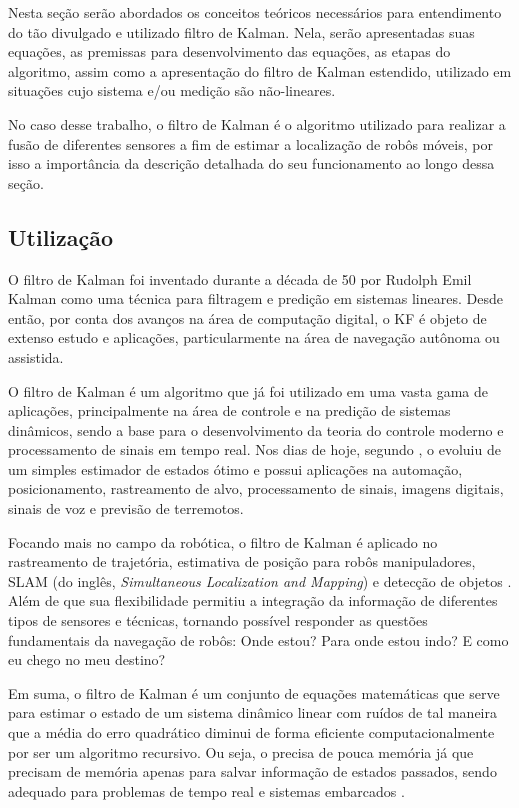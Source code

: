 \documentclass[acronym, symbols, table]{fei}
\begin{document}
		Nesta seção serão abordados os conceitos teóricos necessários para entendimento do tão divulgado e utilizado filtro de Kalman. Nela, serão apresentadas suas equações, as premissas para desenvolvimento das equações, as etapas do algoritmo, assim como a apresentação do filtro de Kalman estendido, utilizado em situações cujo sistema e/ou medição são não-lineares. 
		
		No caso desse trabalho, o filtro de Kalman é o algoritmo utilizado para realizar a fusão de diferentes sensores a fim de estimar a localização de robôs móveis, por isso a importância da descrição detalhada do seu funcionamento ao longo dessa seção.
		
		\subsection{Utilização}
		
			O filtro de Kalman foi inventado durante a década de 50 por Rudolph Emil Kalman como uma técnica para filtragem e predição em sistemas lineares. Desde então, por conta dos avanços na área de computação digital, o KF é objeto de extenso estudo e aplicações, particularmente na área de navegação autônoma ou assistida.
			
			O filtro de Kalman é um algoritmo que já foi utilizado em uma vasta gama de aplicações, principalmente na área de controle e na predição de sistemas dinâmicos, sendo a base para o desenvolvimento da teoria do controle moderno e processamento de sinais em tempo real. Nos dias de hoje, segundo \textcite{khodarahmi2023review}, o  evoluiu de um simples estimador de estados ótimo e possui aplicações na automação, posicionamento, rastreamento de alvo, processamento de sinais, imagens digitais, sinais de voz e previsão de terremotos.
			
			Focando mais no campo da robótica, o filtro de Kalman é aplicado no rastreamento de trajetória, estimativa de posição para robôs manipuladores, SLAM (do inglês, \textit{Simultaneous Localization and Mapping}) e detecção de objetos \cite{urrea2021kalman}. Além de que sua flexibilidade permitiu a integração da informação de diferentes tipos de sensores e técnicas, tornando possível responder as questões fundamentais da navegação de robôs: Onde estou? Para onde estou indo? E como eu chego no meu destino?
			
			Em suma, o filtro de Kalman é um conjunto de equações matemáticas que serve para estimar o estado de um sistema dinâmico linear com ruídos de tal maneira que a média do erro quadrático diminui de forma eficiente computacionalmente por ser um algoritmo recursivo. Ou seja, o  precisa de pouca memória já que precisam de memória apenas para salvar informação de estados passados, sendo adequado para problemas de tempo real e sistemas embarcados \cite{khodarahmi2023review}.
			
\end{document}
